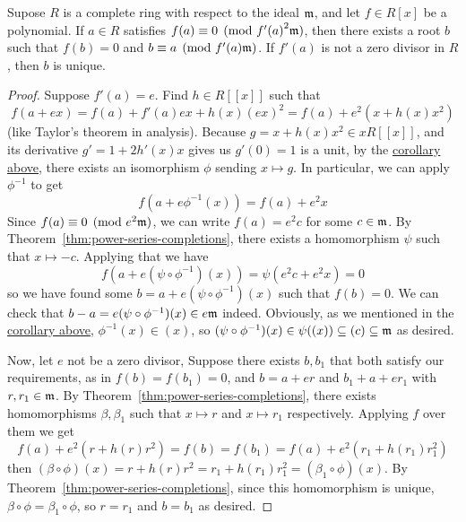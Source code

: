\begin{theorem}\label{thm:hensel}
    Supose \(R\) is a complete ring with respect to the ideal \(\mathfrak{m}\),
    and let \(f \in R[x]\) be a polynomial.
    If \(a \in R\) satisfies \(f(a) \equiv 0 \pmod{{f'(a)}^2\mathfrak{m}}\),
    then there exists a root \(b\) such that \(f(b) = 0\) and \(b \equiv a \pmod{f'(a)\mathfrak{m}}\).
    If \(f'(a)\) is not a zero divisor in \(R\), then \(b\) is unique.
\end{theorem}
\begin{proof}
    Suppose \(f'(a) = e\).
    Find \(h \in R[[x]]\) such that
    \begin{equation*}
        f(a+ex) = f(a) + f'(a)ex + h(x){(ex)}^2 = f(a) + e^2(x + h(x)x^2)
    \end{equation*}
    (like Taylor's theorem in analysis).
    Because \(g = x + h(x)x^2 \in xR[[x]]\), and its derivative \(g' = 1 + 2h'(x)x\) gives us \(g'(0) = 1\) is a unit,
    by the \hyperref[cor:derivative-unit-isomorphism]{corollary above},
    there exists an isomorphism \(\phi\) sending \(x \mapsto g\).
    In particular, we can apply \(\phi^{-1}\) to get
    \begin{equation*}
        f(a+e\phi^{-1}(x)) = f(a) + e^2 x
    \end{equation*}
    Since \(f(a) \equiv 0 \pmod{e^2\mathfrak{m}}\), we can write \(f(a) = e^2 c\) for some \(c \in \mathfrak{m}\).
    By Theorem~\ref{thm:power-series-completions},
    there exists a homomorphism \(\psi\) such that \(x \mapsto -c\).
    Applying that we have
    \begin{equation*}
        f(a+e(\psi\circ\phi^{-1})(x)) = \psi(e^2 c + e^2 x) = 0
    \end{equation*}
    so we have found some \(b = a + e(\psi\circ\phi^{-1})(x)\) such that \(f(b) = 0\).
    We can check that \(b-a = e(\psi\circ\phi^{-1})(x) \in e\mathfrak{m}\) indeed.
    Obviously, as we mentioned in the \hyperref[cor:derivative-unit-isomorphism]{corollary above},
    \(\phi^{-1}(x) \in (x)\), so \((\psi\circ\phi^{-1})(x) \in \psi((x)) \subseteq (c) \subseteq \mathfrak{m}\)
    as desired.

    Now, let \(e\) not be a zero divisor,
    Suppose there exists \(b, b_1\) that both satisfy our requirements,
    as in \(f(b) = f(b_1) = 0\), and \(b = a+er\) and \(b_1 + a+er_1\) with \(r,r_1 \in \mathfrak{m}\).
    By Theorem~\ref{thm:power-series-completions},
    there exists homomorphisms \(\beta,\beta_1\) such that \(x \mapsto r\) and \(x \mapsto r_1\) respectively.
    Applying \(f\) over them we get
    \begin{equation*}
        f(a) + e^2(r + h(r)r^2) = f(b) = f(b_1) = f(a) + e^2(r_1 + h(r_1)r_1^2)
    \end{equation*}
    then \((\beta\circ\phi)(x) = r + h(r)r^2 = r_1 + h(r_1)r_1^2 = (\beta_1\circ\phi)(x)\).
    By Theorem~\ref{thm:power-series-completions}, since this homomorphism is unique,
    \(\beta\circ\phi = \beta_1\circ\phi\), so \(r = r_1\) and \(b = b_1\) as desired.
\end{proof}

